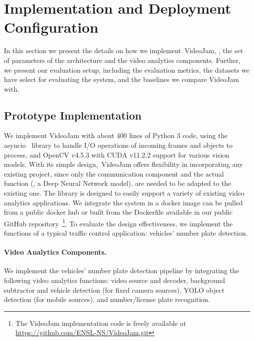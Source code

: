 \section{Implementation and Deployment Configuration}
\label{sec:implementation}

In this section we present the details on how we implement~VideoJam, \ie, the set of parameters of the architecture and the video analytics components. Further, we present our evaluation setup, including the evaluation metrics, the datasets we have select for evaluating the system, and the baselines we compare VideoJam with.

\subsection{Prototype Implementation}

We implement VideoJam with about 400 lines of Python 3 code, using the asyncio~\cite{asyncio} library to handle I/O operations of incoming frames and objects to process, and OpenCV v4.5.3 with CUDA v11.2.2 support for various vision models. With its simple design,~VideoJam offers flexibility in incorporating any existing project, since only the communication component and the actual function (\eg, a Deep Neural Network model), are needed to be adapted to the existing one. The library is designed to easily support a variety of existing video analytics applications. We integrate the system in a docker image can be pulled from a public docker hub or built from the Dockerfile available in our public GitHub repository~\footnote{The VideoJam implementation code is freely available at \href{https://github.com/ENSL-NS/VideoJam.git}{https://github.com/ENSL-NS/VideoJam.git}}. To evaluate the design effectiveness, we implement the functions of a typical traffic control application: vehicles' number plate detection.


\paragraph{Video Analytics Components.} We implement the vehicles' number plate detection pipeline by integrating the following video analytics functions: video source and decoder, background subtractor and vehicle detection (for fixed camera sources), YOLO object detection (for mobile sources), and number/license plate recognition.

